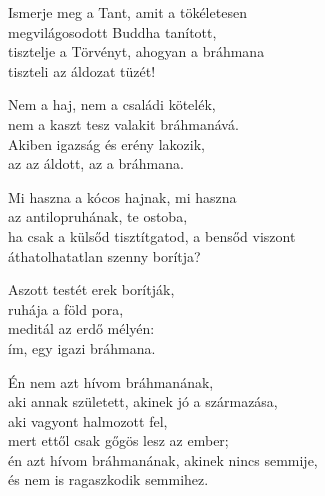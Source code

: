 \begin{dhpverse}

 Ismerje meg a Tant, amit a tökéletesen\\
megvilágosodott Buddha tanított,\\
tisztelje a Törvényt, ahogyan a bráhmana\\
tiszteli az áldozat tüzét!

 Nem a haj, nem a családi kötelék,\\
nem a kaszt tesz valakit bráhmanává.\\
Akiben igazság és erény lakozik,\\
az az áldott, az a bráhmana.

 Mi haszna a kócos hajnak, mi haszna\\
az antilopruhának, te ostoba,\\
ha csak a külsőd tisztítgatod, a bensőd viszont\\
áthatolhatatlan szenny borítja?

 Aszott testét erek borítják,\\
ruhája a föld pora,\\
meditál az erdő mélyén:\\
ím, egy igazi bráhmana.

 Én nem azt hívom bráhmanának,\\
aki annak született, akinek jó a származása,\\
aki vagyont halmozott fel,\\
mert ettől csak gőgös lesz az ember;\\
én azt hívom bráhmanának, akinek nincs semmije,\\
és nem is ragaszkodik semmihez.

\end{dhpverse}
\newpage
